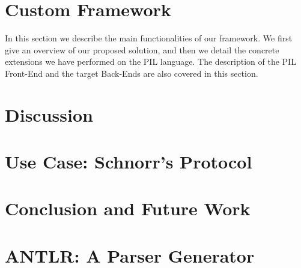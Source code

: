\documentclass{llncs}
\begin{document}
\section{Custom Framework}
In this section we describe the main functionalities of our
framework. We first give an overview of our proposed solution, and
then we detail the concrete extensions we have performed on the PIL
language. The description of the PIL Front-End and the target
Back-Ends are also covered in this section.
\label{customframework}



\section{Discussion}
\label{discussion}


\section{Use Case: Schnorr's Protocol}
\label{schnorr}



%

\section{Conclusion and Future Work}
\label{conclusion}






\appendix
\section{ANTLR: A Parser Generator}

\label{sec:antlr}
%
\end{document}
